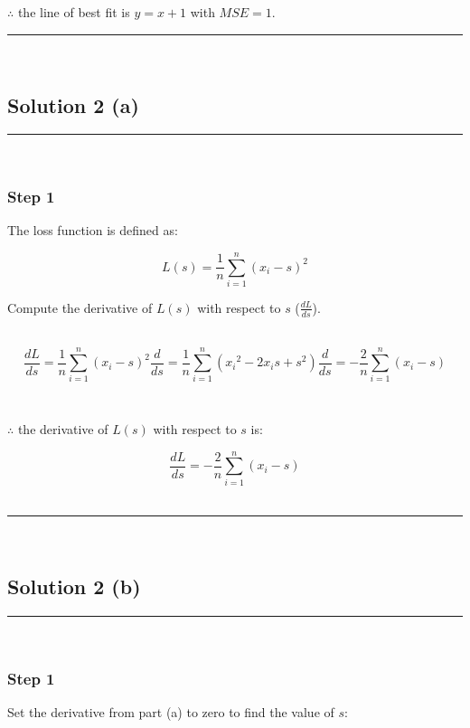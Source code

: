\documentclass{article}
\begin{document}
\subsubsection*{\normalfont}{$\therefore$ the line of best fit is $y = x + 1$ with $MSE = 1$.}\\
\noindent\rule{\textwidth}{0.4pt}\\
\newpage

\newpage

\subsection*{Solution 2 (a)}
\noindent\rule{\textwidth}{0.4pt}\\

\subsubsection*{Step 1}
\parbox{\textwidth}{
The loss function is defined as:
}
$$L(s) = \frac{1}{n} \sum_{i=1}^{n} (x_{i} - s)^{2}$$
\parbox{\textwidth}{
  Compute the derivative of $L(s)$ with respect to $s$ ($\frac{dL}{ds}$).
}\\

$$\frac{dL}{ds} = \frac{1}{n} \sum_{i=1}^{n} (x_{i} - s)^{2} \frac{d}{ds} = \frac{1}{n} \sum_{i=1}^{n} ({x_{i}}^2 -2x_is + s^2) \frac{d}{ds} = -\frac{2}{n} \sum_{i=1}^{n} (x_i - s)$$\\

\subsubsection*{\normalfont}{$\therefore$ the derivative of $L(s)$ with respect to $s$ is:}

$$\frac{dL}{ds} = -\frac{2}{n} \sum_{i=1}^{n} (x_i - s)$$\\

\noindent\rule{\textwidth}{0.4pt}\\

\newpage

\subsection*{Solution 2 (b)}
\noindent\rule{\textwidth}{0.4pt}\\

\subsubsection*{Step 1}
\parbox{\textwidth}{
Set the derivative from part (a) to zero to find the value of $s$:
}\\
\end{document}
